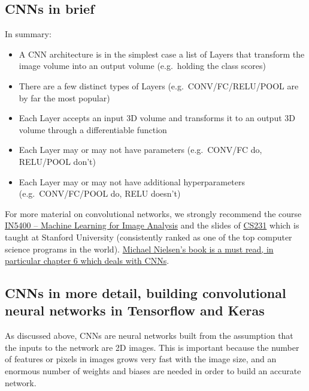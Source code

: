 \documentclass[%
oneside,                 %
final,                   %
10pt]{article}
\begin{document}
\subsection*{CNNs in brief}

In summary:

\begin{itemize}
\item A CNN architecture is in the simplest case a list of Layers that transform the image volume into an output volume (e.g.~holding the class scores)

\item There are a few distinct types of Layers (e.g.~CONV/FC/RELU/POOL are by far the most popular)

\item Each Layer accepts an input 3D volume and transforms it to an output 3D volume through a differentiable function

\item Each Layer may or may not have parameters (e.g.~CONV/FC do, RELU/POOL don’t)

\item Each Layer may or may not have additional hyperparameters (e.g.~CONV/FC/POOL do, RELU doesn’t)
\end{itemize}

\noindent
For more material on convolutional networks, we strongly recommend
the course
\href{{https://www.uio.no/studier/emner/matnat/ifi/IN5400/index-eng.html}}{IN5400 – Machine Learning for Image Analysis}
and the slides of \href{{http://cs231n.github.io/convolutional-networks/}}{CS231} which is taught at Stanford University (consistently ranked as one of the top computer science programs in the world). \href{{http://neuralnetworksanddeeplearning.com/chap6.html}}{Michael Nielsen's book is a must read, in particular chapter 6 which deals with CNNs}.


\subsection*{CNNs in more detail, building convolutional neural networks in Tensorflow and Keras}


As discussed above, CNNs are neural networks built from the assumption that the inputs
to the network are 2D images. This is important because the number of features or pixels in images
grows very fast with the image size, and an enormous number of weights and biases are needed in order to build an accurate network.  
\end{document}
